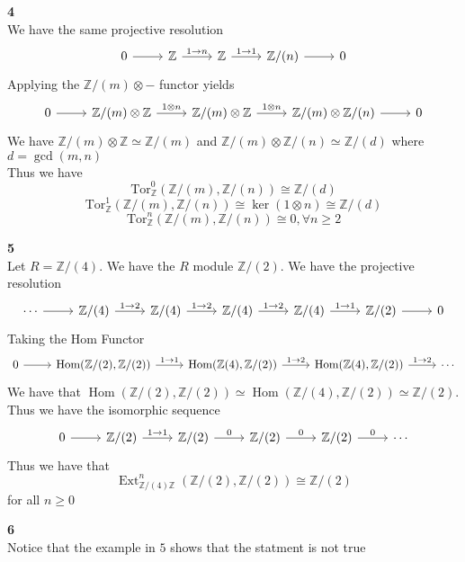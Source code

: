 \documentclass[12pt]{article}
\newenvironment{ques}[1]{\textbf{#1}\vspace{1 mm}\\ }{\bigskip}
\theoremstyle{definition}
\DeclareMathOperator\Ext{Ext}
\DeclareMathOperator\Hom{Hom}
\newcommand{\Z}{\mathbb Z}
\newcommand{\tensor}{\otimes}
\newcommand{\Tor}{\text{Tor}}
\begin{document}
\begin{ques}{4}
	We have the same projective resolution
	$$\begin{tikzcd}
	0 \arrow[r] & \Z \arrow[r, "1 \to n"] & \Z \arrow[r, "1 \to 1"] & \Z/(n)
	\arrow[r] & 0
	\end{tikzcd}$$
	Applying the $\Z/(m) \tensor -$ functor yields
	$$\begin{tikzcd}
	0 \arrow[r] & \Z/(m)\tensor \Z \arrow[r, "1 \tensor n"] & \Z/(m) \tensor \Z
	\arrow[r, "1 \tensor n"] & \Z/(m) \tensor \Z/(n) \arrow[r] & 0
	\end{tikzcd}$$
	We have $\Z/(m) \tensor \Z \simeq \Z/(m)$ and $\Z/(m) \tensor \Z/(n) \simeq
	\Z/(d)$ where $d = \gcd(m,n)$\\
	Thus we have
	$$\Tor_{\Z}^0(\Z/(m), \Z/(n)) \cong \Z/(d)$$
	$$\Tor_{\Z}^1(\Z/(m), \Z/(n)) \cong \ker(1 \tensor n) \cong \Z/(d)$$
	$$\Tor_{\Z}^n(\Z/(m), \Z/(n)) \cong 0, \forall n \geq 2$$

\end{ques}

\begin{ques}{5}
	Let $R = \Z/(4)$. We have the $R$ module $\Z/(2)$. We have the
	projective resolution
	$$\begin{tikzcd}
	\cdots \arrow[r] & \Z/(4) \arrow[r, "1 \to 2"] & \Z/(4) \arrow[r, "1 \to 2"] & \Z/(4)
	\arrow[r, "1 \to 2"] & \Z/(4) \arrow[r, "1 \to 1"] & \Z/(2)\arrow[r] & 0
	\end{tikzcd}$$
	Taking the Hom Functor
	$$\begin{tikzcd}
	0 \arrow[r] & \Hom(\Z/(2),\Z/(2)) \arrow[r, "1 \to 1"] & \Hom(\Z(4), \Z/(2))
	\arrow[r, "1 \to 2"] & \Hom(\Z(4), \Z/(2)) \arrow[r, "1 \to 2"] & \cdots
	\end{tikzcd}$$
	We have that $\Hom(\Z/(2),\Z/(2)) \simeq \Hom(\Z/(4),\Z/(2)) \simeq
	\Z/(2)$. Thus we have the isomorphic sequence
	$$\begin{tikzcd}
	0 \arrow[r] & \Z/(2) \arrow[r, "1 \to 1"] & \Z/(2) \arrow[r, "0"] & \Z/(2)
	\arrow[r, "0"] & \Z/(2) \arrow[r, "0"] & \cdots
	\end{tikzcd}$$
	Thus we have that
	$$\Ext_{\Z/(4)\Z}^n(\Z/(2), \Z/(2)) \cong \Z/(2)$$
	for all $n \geq 0$
\end{ques}

\begin{ques}{6}
	Notice that the example in $5$ shows that the statment is not true
\end{ques}
\end{document}
